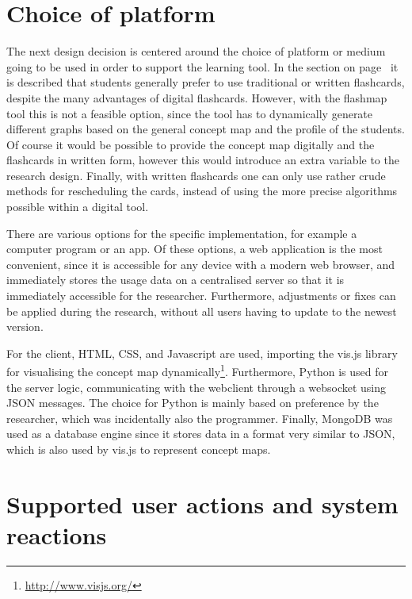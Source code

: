 \section{Choice of platform}

The next design decision is centered around the choice of platform or medium going to be used in order to support the learning tool. In the section  on page~\pageref{subsec:fcapplication} it is described that students generally prefer to use traditional or written flashcards, despite the many advantages of digital flashcards. However, with the flashmap tool this is not a feasible option, since the tool has to dynamically generate different graphs based on the general concept map and the profile of the students. Of course it would be possible to provide the concept map digitally and the flashcards in written form, however this would introduce an extra variable to the research design. Finally, with written flashcards one can only use rather crude methods for rescheduling the cards, instead of using the more precise algorithms possible within a digital tool.

There are various options for the specific implementation, for example a computer program or an app. Of these options, a web application is the most convenient, since it is accessible for any device with a modern web browser, and immediately stores the usage data on a centralised server so that it is immediately accessible for the researcher. Furthermore, adjustments or fixes can be applied during the research, without all users having to update to the newest version.

For the client, HTML, CSS, and Javascript are used, importing the vis.js library for visualising the concept map dynamically\footnote{\url{http://www.visjs.org/}}. Furthermore, Python is used for the server logic, communicating with the webclient through a websocket using JSON messages. The choice for Python is mainly based on preference by the researcher, which was incidentally also the programmer. Finally, MongoDB was used as a database engine since it stores data in a format very similar to JSON, which is also used by vis.js to represent concept maps.

\section{Supported user actions and system reactions}


